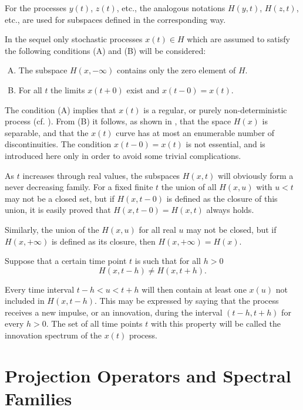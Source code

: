 \documentclass[11pt]{article}
\begin{document}
For the processes $y(t)$, $z(t)$, etc., the analogous notations $H(y, t)$, $H(z, t)$, etc., are used for subspaces defined in the corresponding way.

In the sequel only stochastic processes $x(t) \in H$ which are assumed to satisfy the following conditions (A) and (B) will be considered:

\begin{enumerate}[(A)]
\item The subspace $H(x, -\infty)$ contains only the zero element of $H$.
\item For all $t$ the limits $x(t + 0)$ exist and $x(t - 0) = x(t)$.
\end{enumerate}

The condition (A) implies that $x(t)$ is a regular, or purely non-deterministic process (cf. \cite{cramer1961a}). From (B) it follows, as shown in \cite{cramer1961a}, that the space $H(x)$ is separable, and that the $x(t)$ curve has at most an enumerable number of discontinuities. The condition $x(t - 0) = x(t)$ is not essential, and is introduced here only in order to avoid some trivial complications.

As $t$ increases through real values, the subspaces $H(x, t)$ will obviously form a never decreasing family. For a fixed finite $t$ the union of all $H(x, u)$ with $u < t$ may not be a closed set, but if $H(x, t - 0)$ is defined as the closure of this union, it is easily proved that $H(x, t - 0) = H(x, t)$ always holds.

Similarly, the union of the $H(x, u)$ for all real $u$ may not be closed, but if $H(x, +\infty)$ is defined as its closure, then $H(x, +\infty) = H(x)$.

Suppose that a certain time point $t$ is such that for all $h > 0$
\begin{equation}
H(x, t - h) \neq H(x, t + h).
\label{eq:innovation_condition}
\end{equation}

Every time interval $t - h < u < t + h$ will then contain at least one $x(u)$ not included in $H(x, t - h)$. This may be expressed by saying that the process receives a new impulse, or an innovation, during the interval $(t - h, t + h)$ for every $h > 0$. The set of all time points $t$ with this property will be called the innovation spectrum of the $x(t)$ process.

\section{Projection Operators and Spectral Families}
\end{document}
